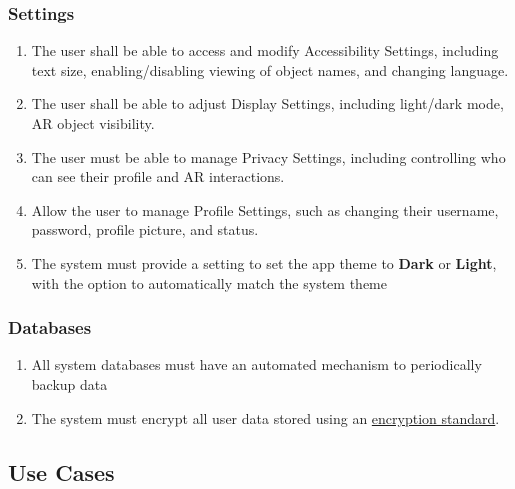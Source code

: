 \documentclass{article}
\begin{document}
\subsubsection{Settings}
\label{ssub:settings}
\begin{enumerate}[align=left, label=\textbf{S-FR\arabic*:}]
    \item The user shall be able to access and modify Accessibility Settings, including text size, enabling/disabling viewing of object names, and changing language.
    \item The user shall be able to adjust Display Settings, including light/dark mode, AR object visibility.
    \item The user must be able to manage Privacy Settings, including controlling who can see their profile and AR interactions.
    \item Allow the user to manage Profile Settings, such as changing their username, password, profile picture, and status.
    \item The system must provide a setting to set the app theme to \textbf{Dark} or \textbf{Light}, with the option to automatically match the system theme \\
\end{enumerate}

\subsubsection{Databases}

\begin{enumerate}[align=left, label=\textbf{DB-FR\arabic*:}]
    \item All system databases must have an automated mechanism to periodically backup data \\
    \item The system must encrypt all user data stored using an \hyperref[def:encryption_standard]{encryption standard}. \\
\end{enumerate}

\subsection{Use Cases}
\label{sub:use_cases}
\end{document}
